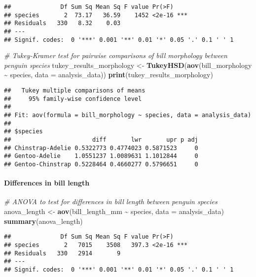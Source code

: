 \documentclass[
]{article}
\newenvironment{Shaded}{\begin{snugshade}}{\end{snugshade}}
\newcommand{\AttributeTok}[1]{\textcolor[rgb]{0.13,0.29,0.53}{#1}}
\newcommand{\CommentTok}[1]{\textcolor[rgb]{0.56,0.35,0.01}{\textit{#1}}}
\newcommand{\FunctionTok}[1]{\textcolor[rgb]{0.13,0.29,0.53}{\textbf{#1}}}
\newcommand{\NormalTok}[1]{#1}
\newcommand{\OtherTok}[1]{\textcolor[rgb]{0.56,0.35,0.01}{#1}}
\newcommand{\SpecialCharTok}[1]{\textcolor[rgb]{0.81,0.36,0.00}{\textbf{#1}}}
\begin{document}
\begin{verbatim}
##              Df Sum Sq Mean Sq F value Pr(>F)    
## species       2  73.17   36.59    1452 <2e-16 ***
## Residuals   330   8.32    0.03                   
## ---
## Signif. codes:  0 '***' 0.001 '**' 0.01 '*' 0.05 '.' 0.1 ' ' 1
\end{verbatim}

\begin{Shaded}
\begin{Highlighting}[]
\CommentTok{\# Tukey{-}Kramer test for pairwise comparisons of bill morphology between penguin species}
\NormalTok{tukey\_results\_morphology }\OtherTok{\textless{}{-}} \FunctionTok{TukeyHSD}\NormalTok{(}\FunctionTok{aov}\NormalTok{(bill\_morphology }\SpecialCharTok{\textasciitilde{}}\NormalTok{ species, }\AttributeTok{data =}\NormalTok{ analysis\_data))}
\FunctionTok{print}\NormalTok{(tukey\_results\_morphology)}
\end{Highlighting}
\end{Shaded}

\begin{verbatim}
##   Tukey multiple comparisons of means
##     95% family-wise confidence level
## 
## Fit: aov(formula = bill_morphology ~ species, data = analysis_data)
## 
## $species
##                       diff       lwr       upr p adj
## Chinstrap-Adelie 0.5322773 0.4774023 0.5871523     0
## Gentoo-Adelie    1.0551237 1.0089631 1.1012844     0
## Gentoo-Chinstrap 0.5228464 0.4660277 0.5796651     0
\end{verbatim}

\paragraph{Differences in bill length}\label{differences-in-bill-length}

\begin{Shaded}
\begin{Highlighting}[]
\CommentTok{\# ANOVA to test for differences in bill length between penguin species}
\NormalTok{anova\_length }\OtherTok{\textless{}{-}} \FunctionTok{aov}\NormalTok{(bill\_length\_mm }\SpecialCharTok{\textasciitilde{}}\NormalTok{ species, }\AttributeTok{data =}\NormalTok{ analysis\_data)}
\FunctionTok{summary}\NormalTok{(anova\_length)}
\end{Highlighting}
\end{Shaded}

\begin{verbatim}
##              Df Sum Sq Mean Sq F value Pr(>F)    
## species       2   7015    3508   397.3 <2e-16 ***
## Residuals   330   2914       9                   
## ---
## Signif. codes:  0 '***' 0.001 '**' 0.01 '*' 0.05 '.' 0.1 ' ' 1
\end{verbatim}
\end{document}
